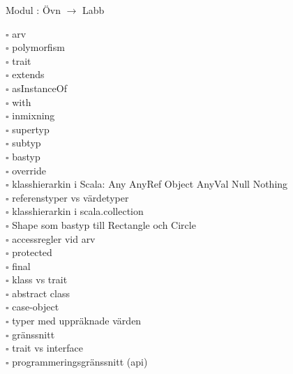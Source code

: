 
    Modul : Övn  $\rightarrow$ Labb 
    \begin{multicols}{3}\SlideFontTiny
    $\square$ arv \\
$\square$ polymorfism \\
$\square$ trait \\
$\square$ extends \\
$\square$ asInstanceOf \\
$\square$ with \\
$\square$ inmixning \\
$\square$ supertyp \\
$\square$ subtyp \\
$\square$ bastyp \\
$\square$ override \\
$\square$ klasshierarkin i Scala: Any AnyRef Object AnyVal Null Nothing \\
$\square$ referenstyper vs värdetyper \\
$\square$ klasshierarkin i scala.collection \\
$\square$ Shape som bastyp till Rectangle och Circle \\
$\square$ accessregler vid arv \\
$\square$ protected \\
$\square$ final \\
$\square$ klass vs trait \\
$\square$ abstract class \\
$\square$ case-object \\
$\square$ typer med uppräknade värden \\
$\square$ gränssnitt \\
$\square$ trait vs interface \\
$\square$ programmeringsgränssnitt (api) \\
    \end{multicols}
    